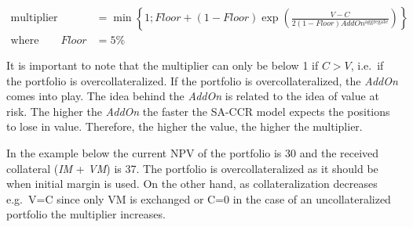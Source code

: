 \begin{align*}
\text{multiplier} &= \min \left\{ 1; Floor + (1-Floor) \exp\left(\frac{V-C}{2(1-Floor)AddOn^{\text{aggregate}}}\right) \right\} \\
\text{where} \qquad Floor &= 5\%
\end{align*}

It is important to note that the multiplier can only be below 1 if
\(C>V\), i.e.~if the portfolio is overcollateralized. If the portfolio
is overcollateralized, the \emph{AddOn} comes into play. The idea behind
the \emph{AddOn} is related to the idea of value at risk. The higher the
\emph{AddOn} the faster the SA-CCR model expects the positions to lose
in value. Therefore, the higher the value, the higher the multiplier.

In the example below the current NPV of the portfolio is 30 and the
received collateral (\emph{IM} + \emph{VM}) is 37. The portfolio is
overcollateralized as it should be when initial margin is used. On the
other hand, as collateralization decreases e.g.~V=C since only VM is
exchanged or C=0 in the case of an uncollateralized portfolio the
multiplier increases.


